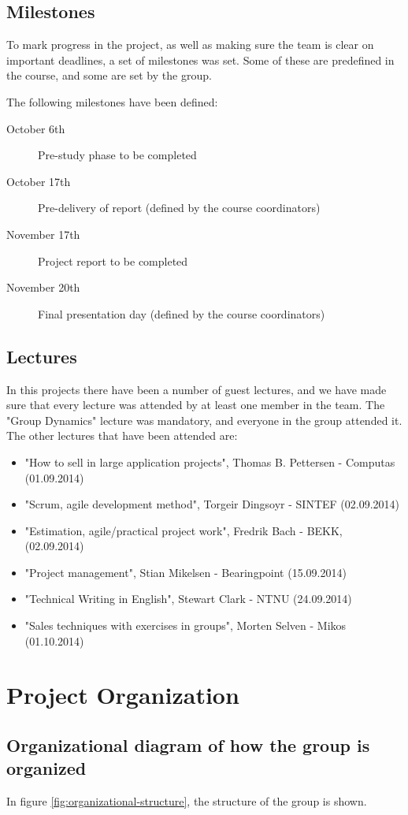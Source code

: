 \documentclass[11pt,a4paper,titlepage,oneside]{report}
\begin{document}
\subsection{Milestones}
To mark progress in the project, as well as making sure the team is clear on important deadlines, a set of milestones was set. Some of these are predefined in the course, and some are set by the group. 

The following milestones have been defined:
\begin{description}
\item[October 6th] Pre-study phase to be completed
\item[October 17th] Pre-delivery of report (defined by the course coordinators)
\item[November 17th] Project report to be completed
\item[November 20th] Final presentation day (defined by the course coordinators)
\end{description}

\subsection{Lectures}
In this projects there have been a number of guest lectures, and we have made sure that every lecture was attended by at least one member in the team.
The "Group Dynamics" lecture was mandatory, and everyone in the group attended it.
The other lectures that have been attended are:
\begin{itemize}
\item "How to sell in large application projects", Thomas B. Pettersen - Computas (01.09.2014)
\item "Scrum, agile development method", Torgeir Dingsoyr - SINTEF (02.09.2014)
\item "Estimation, agile/practical project work", Fredrik Bach - BEKK, (02.09.2014)
\item "Project management", Stian Mikelsen - Bearingpoint (15.09.2014)
\item "Technical Writing in English", Stewart Clark - \gls{NTNU} (24.09.2014)
\item "Sales techniques with exercises in groups", Morten Selven - Mikos (01.10.2014)
\end{itemize}

\section{Project Organization}
\subsection{Organizational diagram of how the group is organized}
In figure \ref{fig:organizational-structure}, the structure of the group is shown. 
\end{document}

